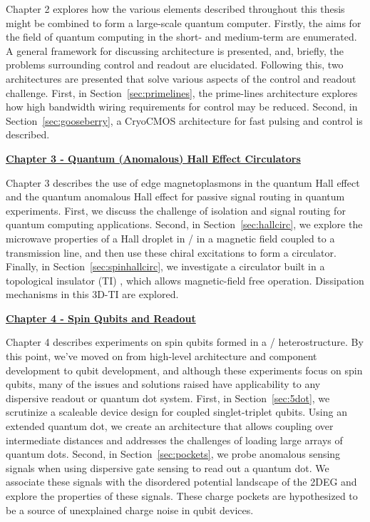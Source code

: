 \noindent
Chapter 2 explores how the various elements described throughout this thesis might be combined to form
a large-scale quantum computer. Firstly, the aims for the field of quantum computing in the short- and medium-term are
enumerated. A general framework for discussing architecture is presented, and, briefly, the problems surrounding control
and readout are elucidated. Following this, two architectures are presented that solve various aspects of the control
and readout challenge. First, in Section~\ref{sec:primelines}, the prime-lines architecture explores how high bandwidth
wiring requirements for control may be reduced. Second, in Section~\ref{sec:gooseberry}, a CryoCMOS architecture for fast
pulsing and control is described.

\medskip
\noindent\textbf{\hyperref[sec:hall]{Chapter 3 - Quantum (Anomalous) Hall Effect Circulators}}

\noindent
Chapter 3 describes the use of edge magnetoplasmons in the quantum Hall effect and the quantum anomalous Hall effect
for passive signal routing in quantum experiments. First, we discuss the challenge of isolation and signal routing
for quantum computing applications. Second, in Section~\ref{sec:hallcirc}, we explore the microwave properties of a
Hall droplet in / in a magnetic field coupled to a transmission line, and then use these chiral
excitations to form a circulator. Finally, in Section~\ref{sec:spinhallcirc}, we investigate a circulator built in a topological
insulator (TI) , which allows magnetic-field free operation. Dissipation mechanisms in this 3D-TI
are explored.

\medskip
\noindent\textbf{\hyperref[sec:spinqubit]{Chapter 4 - Spin Qubits and Readout}}

\noindent
Chapter 4 describes experiments on spin qubits formed in a / heterostructure. By this point, we've moved
on from high-level architecture and component development to qubit development, and although these experiments focus on
spin qubits, many of the issues and solutions raised have applicability to any dispersive readout or quantum dot system.
First, in Section~\ref{sec:5dot}, we scrutinize a scaleable device design for coupled singlet-triplet qubits. Using an
extended quantum dot, we create an architecture that allows coupling over intermediate distances and addresses the challenges
of loading large arrays of quantum dots. Second, in Section~\ref{sec:pockets}, we probe anomalous sensing signals when
using dispersive gate sensing to read out a quantum dot. We associate these signals with the disordered potential landscape
of the 2DEG and explore the properties of these signals. These charge pockets are hypothesized to be a source of unexplained
charge noise in qubit devices.

